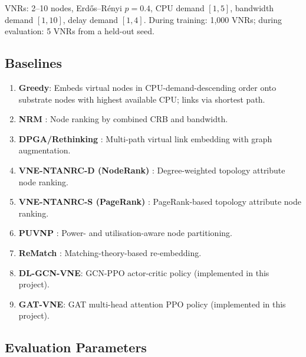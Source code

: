 \documentclass[12pt,a4paper]{report}
\begin{document}
VNRs: 2--10 nodes, Erdős--Rényi $p=0.4$, CPU demand $[1,5]$, bandwidth demand $[1,10]$,
delay demand $[1,4]$. During training: 1,000 VNRs; during evaluation: 5 VNRs from a
held-out seed.

\subsection{Baselines}

\begin{enumerate}[leftmargin=*]
  \item \textbf{Greedy}: Embeds virtual nodes in CPU-demand-descending order onto substrate
        nodes with highest available CPU; links via shortest path.
  \item \textbf{NRM} \cite{zhang2017nrm}: Node ranking by combined CRB and bandwidth.
  \item \textbf{DPGA/Rethinking} \cite{nguyen2020rethinking}: Multi-path virtual link
        embedding with graph augmentation.
  \item \textbf{VNE-NTANRC-D (NodeRank)} \cite{cao2018ntanrc}: Degree-weighted topology
        attribute node ranking.
  \item \textbf{VNE-NTANRC-S (PageRank)} \cite{cao2018ntanrc}: PageRank-based topology
        attribute node ranking.
  \item \textbf{PUVNP} \cite{zhang2018puvnp}: Power- and utilisation-aware node partitioning.
  \item \textbf{ReMatch} \cite{satpathy2022rematch}: Matching-theory-based re-embedding.
  \item \textbf{DL-GCN-VNE}: GCN-PPO actor-critic policy (implemented in this project).
  \item \textbf{GAT-VNE}: GAT multi-head attention PPO policy (implemented in this project).
\end{enumerate}

\subsection{Evaluation Parameters}
\end{document}

